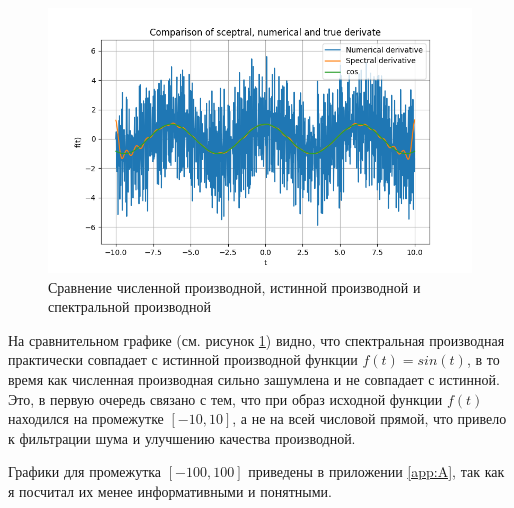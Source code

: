 \begin{figure}[ht!]
    \centering
    \includegraphics[width=\textwidth]{../results/10/derivative_cmp.png}
    \caption{Сравнение численной производной, истинной производной и спектральной производной}
    \label{fig:derivative_cmp}
\end{figure}

\FloatBarrier
На сравнительном графике (см. рисунок \ref{fig:derivative_cmp}) видно, что спектральная производная практически совпадает с истинной производной функции $f(t) = sin(t)$, в то время как численная производная сильно зашумлена и не совпадает с истинной.
Это, в первую очередь связано с тем, что при образ исходной функции $f(t)$ находился на промежутке $[-10, 10]$, а не на всей числовой прямой, что привело к фильтрации шума и улучшению качества производной. 

Графики для промежутка $[-100, 100]$ приведены в приложении \ref{app:A}, так как я посчитал их менее информативными и понятными. 